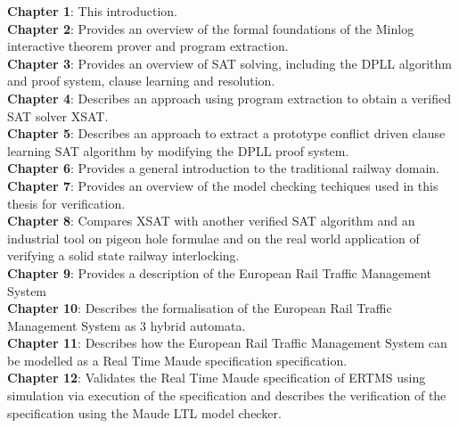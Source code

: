 \textbf{Chapter 1}: This introduction. 
\medskip \\
\textbf{Chapter 2}: Provides an overview of the formal foundations of the Minlog interactive theorem prover and program extraction. 
\medskip \\
\textbf{Chapter 3}: Provides an overview of SAT solving, including the DPLL algorithm and  proof system, clause learning and resolution. 
\medskip \\
\textbf{Chapter 4}: Describes an approach using program extraction to obtain a verified SAT solver XSAT.
\medskip  \\
\textbf{Chapter 5}: Describes an approach to extract a prototype conflict driven clause learning SAT algorithm by modifying the DPLL proof system.
\medskip \\
\textbf{Chapter 6}: Provides a general introduction to the traditional railway domain.
\medskip \\
\textbf{Chapter 7}: Provides an overview of the model checking techiques used in this thesis for verification. \medskip \\
\textbf{Chapter 8}: Compares XSAT with another verified SAT algorithm and an industrial tool on pigeon hole formulae and on the real world application of verifying a solid state railway interlocking.
\medskip \\
\textbf{Chapter 9}: Provides a description of the European Rail Traffic Management System
\medskip \\
\textbf{Chapter 10}: Describes the formalisation of the European Rail Traffic Management System as 3 hybrid automata. 
\medskip \\
\textbf{Chapter 11}: Describes how the European Rail Traffic Management System can be modelled as a Real Time Maude specification  specification. 
\medskip \\
\textbf{Chapter 12}: Validates the Real Time Maude specification of ERTMS using simulation via execution of the specification and describes the verification of the specification using the Maude LTL model checker.


\medskip

